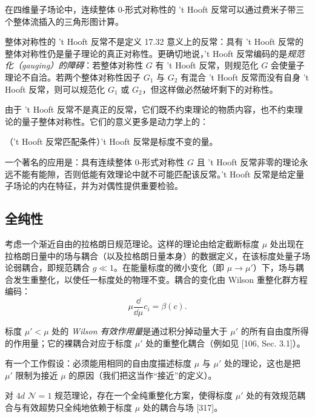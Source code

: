 在四维量子场论中，连续整体 0-形式对称性的 't Hooft 反常可以通过费米子带三个整体流插入的三角形图计算。

\begin{remark}[17.39]
整体对称性的 't Hooft 反常不是定义 17.32 意义上的反常：具有 't Hooft 反常的整体对称性仍是量子理论的真正对称性。更确切地说，'t Hooft 反常编码的是\emph{规范化（gauging）的障碍}：若整体对称性 $G$ 有 't Hooft 反常，则规范化 $G$ 会使量子理论不自洽。若两个整体对称性因子 $G_1$ 与 $G_2$ 有混合 't Hooft
反常而没有自身 't Hooft 反常，则可以规范化 $G_1$ 或 $G_2$，但这样做必然破坏剩下的对称性。
\end{remark}

由于 't Hooft 反常不是真正的反常，它们既不约束理论的物质内容，也不约束理论的量子整体对称性。它们的意义更多是动力学上的：

\begin{proposition}[17.40]
（'t Hooft 反常匹配条件）'t Hooft 反常是标度不变的量。
\end{proposition}

一个著名的应用是：具有连续整体 0-形式对称性 $G$ 且 't Hooft 反常非零的理论永远不能有能隙，否则低能有效理论中就不可能匹配该反常。't Hooft 反常是给定量子场论的内在特征，并为对偶性提供重要检验。

\subsection{全纯性}

考虑一个渐近自由的拉格朗日规范理论。这样的理论由给定截断标度 $\mu$ 处出现在拉格朗日量中的场与耦合（以及拉格朗日量本身）的数据定义，在该标度处量子场论弱耦合，即规范耦合 $g\ll1$。在能量标度的微小变化（即 $\mu\to\mu'$）下，场与耦合发生重整化，以使任一标度处的物理不变。耦合的变化由 Wilson 重整化群方程编码：
\[
\mu\frac{\dd}{\dd\mu}c_i=\beta(c).
\]

\begin{definition}[17.41]
标度 $\mu'<\mu$ 处的 \emph{Wilson 有效作用量}是通过积分掉动量大于 $\mu'$ 的所有自由度所得的作用量；它的裸耦合对应于标度 $\mu'$ 处的重整化耦合（例如见 [106, Sec. 3.1]）。
\end{definition}

有一个工作假设：必须能用相同的自由度描述标度 $\mu$ 与 $\mu'$ 处的理论，这也是把 $\mu'$ 限制为接近 $\mu$ 的原因（我们把这当作“接近”的定义）。

\begin{proposition}[17.42]
对 $4d$ $\mathcal{N}=1$ 规范理论，存在一个全纯重整化方案，使得标度 $\mu'$ 处的有效规范耦合与有效超势只全纯地依赖于标度 $\mu$ 处的耦合与场 [317]。
\end{proposition}

